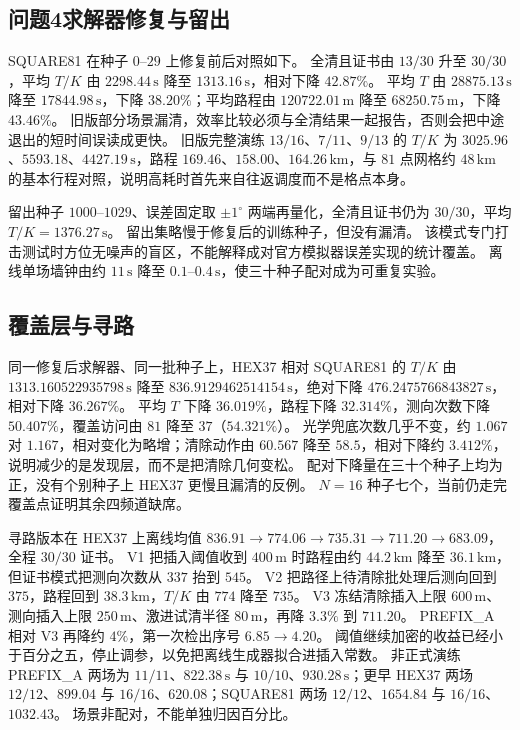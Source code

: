\subsection{问题4求解器修复与留出}

SQUARE81 在种子 $0$--$29$ 上修复前后对照如下。
全清且证书由 $13/30$ 升至 $30/30$，平均 $T/K$ 由 $2298.44\,\mathrm{s}$ 降至 $1313.16\,\mathrm{s}$，相对下降 $42.87\%$。
平均 $T$ 由 $28875.13\,\mathrm{s}$ 降至 $17844.98\,\mathrm{s}$，下降 $38.20\%$；平均路程由 $120722.01\,\mathrm{m}$ 降至 $68250.75\,\mathrm{m}$，下降 $43.46\%$。
旧版部分场景漏清，效率比较必须与全清结果一起报告，否则会把中途退出的短时间误读成更快。
旧版完整演练 $13/16$、$7/11$、$9/13$ 的 $T/K$ 为 $3025.96$、$5593.18$、$4427.19\,\mathrm{s}$，路程 $169.46$、$158.00$、$164.26\,\mathrm{km}$，与 $81$ 点网格约 $48\,\mathrm{km}$ 的基本行程对照，说明高耗时首先来自往返调度而不是格点本身。

留出种子 $1000$--$1029$、误差固定取 $\pm 1^\circ$ 两端再量化，全清且证书仍为 $30/30$，平均 $T/K=1376.27\,\mathrm{s}$。
留出集略慢于修复后的训练种子，但没有漏清。
该模式专门打击测试时方位无噪声的盲区，不能解释成对官方模拟器误差实现的统计覆盖。
离线单场墙钟由约 $11\,\mathrm{s}$ 降至 $0.1$--$0.4\,\mathrm{s}$，使三十种子配对成为可重复实验。

\subsection{覆盖层与寻路}

同一修复后求解器、同一批种子上，HEX37 相对 SQUARE81 的 $T/K$ 由 $1313.160522935798\,\mathrm{s}$ 降至 $836.9129462514154\,\mathrm{s}$，绝对下降 $476.2475766843827\,\mathrm{s}$，相对下降 $36.267\%$。
平均 $T$ 下降 $36.019\%$，路程下降 $32.314\%$，测向次数下降 $50.407\%$，覆盖访问由 $81$ 降至 $37$（$54.321\%$）。
光学兜底次数几乎不变，约 $1.067$ 对 $1.167$，相对变化为略增；清除动作由 $60.567$ 降至 $58.5$，相对下降约 $3.412\%$，说明减少的是发现层，而不是把清除几何变松。
配对下降量在三十个种子上均为正，没有个别种子上 HEX37 更慢且漏清的反例。
$N=16$ 种子七个，当前仍走完覆盖点证明其余四频道缺席。

寻路版本在 HEX37 上离线均值 $836.91\to 774.06\to 735.31\to 711.20\to 683.09$，全程 $30/30$ 证书。
V1 把插入阈值收到 $400\,\mathrm{m}$ 时路程由约 $44.2\,\mathrm{km}$ 降至 $36.1\,\mathrm{km}$，但证书模式把测向次数从 $337$ 抬到 $545$。
V2 把路径上待清除批处理后测向回到 $375$，路程回到 $38.3\,\mathrm{km}$，$T/K$ 由 $774$ 降至 $735$。
V3 冻结清除插入上限 $600\,\mathrm{m}$、测向插入上限 $250\,\mathrm{m}$、激进试清半径 $80\,\mathrm{m}$，再降 $3.3\%$ 到 $711.20$。
PREFIX\_A 相对 V3 再降约 $4\%$，第一次检出序号 $6.85\to 4.20$。
阈值继续加密的收益已经小于百分之五，停止调参，以免把离线生成器拟合进插入常数。
非正式演练 PREFIX\_A 两场为 $11/11$、$822.38\,\mathrm{s}$ 与 $10/10$、$930.28\,\mathrm{s}$；更早 HEX37 两场 $12/12$、$899.04$ 与 $16/16$、$620.08$；SQUARE81 两场 $12/12$、$1654.84$ 与 $16/16$、$1032.43$。
场景非配对，不能单独归因百分比。

